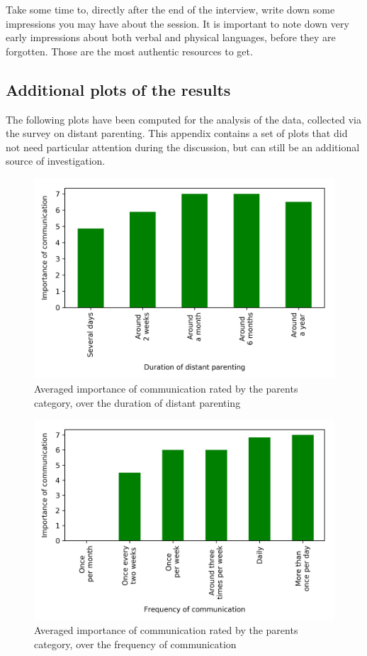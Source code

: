 Take some time to, directly after the end of the interview, write down some impressions you may have about the session. It is important to note down very early impressions about both verbal and physical languages, before they are forgotten. Those are the most authentic resources to get.


\subsection{Additional plots of the results}
\label{appendix:additional-plots}

The following plots have been computed for the analysis of the data, collected via the survey on distant parenting. This appendix contains a set of plots that did not need particular attention during the discussion, but can still be an additional source of investigation.

\begin{figure}[H]
    \centering
    \includegraphics[scale=0.58]{plots/plot_5.png}
    \caption{Averaged importance of communication rated by the parents category, over the duration of distant parenting}
    \label{fig:plot_5}
\end{figure}

\begin{figure}[H]
    \centering
    \includegraphics[scale=0.58]{plots/plot_8.png}
    \caption{Averaged importance of communication rated by the parents category, over the frequency of communication}
    \label{fig:plot_8}
\end{figure}

